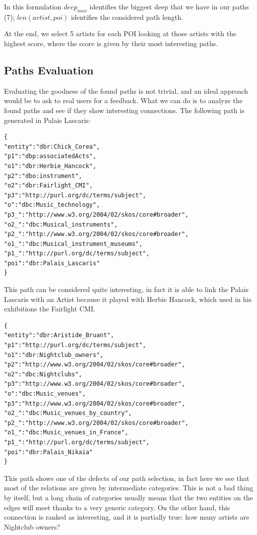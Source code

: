 \documentclass[paper=a4, fontsize=11pt]{scrartcl}
\begin{document}
In this formulation $deep_{max}$ identifies the biggest deep that we have in our paths (7); $len(artist,poi)$ identifies the considered path length.

At the end, we select 5 artists for each POI looking at those artists with the highest score, where the score is given by their most interesting paths.

\subsection{Paths Evaluation}
Evaluating the goodness of the found paths is not trivial, and an ideal approach would be to ask to real users for a feedback.
What we can do is to analyze the found paths and see if they show interesting connections.
The following path is generated in Palais Lascaris:
\begin{lstlisting}
{
"entity":"dbr:Chick_Corea",
"p1":"dbp:associatedActs",
"o1":"dbr:Herbie_Hancock",
"p2":"dbo:instrument",
"o2":"dbr:Fairlight_CMI",
"p3":"http://purl.org/dc/terms/subject",
"o":"dbc:Music_technology",
"p3_":"http://www.w3.org/2004/02/skos/core#broader",
"o2_":"dbc:Musical_instruments",
"p2_":"http://www.w3.org/2004/02/skos/core#broader",
"o1_":"dbc:Musical_instrument_museums",
"p1_":"http://purl.org/dc/terms/subject",
"poi":"dbr:Palais_Lascaris"
}
\end{lstlisting}
This path can be considered quite interesting, in fact it is able to link the Palais Lascaris with an Artist because it played with Herbie Hancock, which used in his exhibitions the Fairlight CMI.
\begin{lstlisting}
{
"entity":"dbr:Aristide_Bruant",
"p1":"http://purl.org/dc/terms/subject",
"o1":"dbr:Nightclub_owners",
"p2":"http://www.w3.org/2004/02/skos/core#broader",
"o2":"dbc:Nightclubs",
"p3":"http://www.w3.org/2004/02/skos/core#broader",
"o":"dbc:Music_venues",
"p3":"http://www.w3.org/2004/02/skos/core#broader",
"o2_":"dbc:Music_venues_by_country",
"p2_":"http://www.w3.org/2004/02/skos/core#broader",
"o1_":"dbc:Music_venues_in_France",
"p1_":"http://purl.org/dc/terms/subject",
"poi":"dbr:Palais_Nikaia"
}
\end{lstlisting}
This path shows one of the defects of our path selection, in fact here we see that most of the relations are given by intermediate categories. This is not a bad thing by itself, but a long chain of categories usually means that the two entities on the edges will meet thanks to a very generic category. On the other hand, this connection is ranked as interesting, and it is partially true: how many artists are Nightclub owners?
\end{document}
